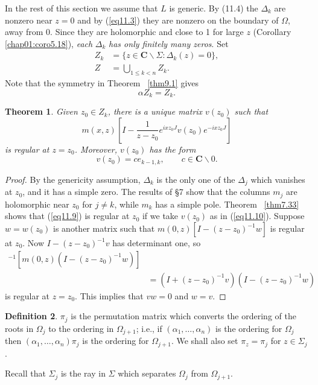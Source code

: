\documentclass{surv-l}
\theoremstyle{plain}
\newtheorem{theorem}{Theorem}[section]
\theoremstyle{definition}
\newtheorem{definition}[theorem]{Definition}
\numberwithin{equation}{chapter}
\begin{document}
In the rest of this section we assume that $L$ is generic. By (11.4) the $\Delta_{k}$ are nonzero near $z=0$ and by (\ref{eq11.3}) they are nonzero on the boundary of $\Omega$, away from $0$. Since they are holomorphic and close to 1 for large $z$ (Corollary \ref{chap01:coro5.18}), \emph{each} $\Delta_{k}$ \emph{has only finitely many zeros}. Set
\setcounter{equation}{5}
\begin{align}\label{eq11.6}
Z_{k}&=\{z\in \mathbf{C}\backslash \Sigma:\Delta_{k}(z)=0\},\\ \nonumber
Z&=\bigcup_{1\leq k<n}Z_{k}.
\end{align}
Note that the symmetry in Theorem ~\ref{thm9.1} gives
\begin{equation}\label{eq11.7}
\alpha Z_{k}=Z_{k}.
\end{equation}
\setcounter{theorem}{7}
\begin{theorem}\label{thm11.8}  Given $z_{0}\in Z_{k}$,  there is a  unique matrix $v(z_{0})$  such that
\setcounter{equation}{8}
\begin{equation}\label{eq11.9}
m(x, z)\left[I-\frac{1}{z-z_{0}}e^{ixz_{0}J}v(z_{0})e^{-ixz_{0}J}\right]
\end{equation}
is regular at $z=z_{0}$. Moreover, $v(z_{0})$ has the form
\begin{equation}\label{eq11.10}
v(z_{0})=ce_{k-1,k},\qquad c\in \mathbf{C}\backslash 0.
\end{equation}
\end{theorem}

\begin{proof} By the genericity assumption, $\Delta_{k}$ is the only one of the $\Delta_{j}$ which vanishes at $z_{0}$, and it has a simple zero. The results of \S 7 show that the columns $m_{j}$ are holomorphic near $z_{0}$ for $j \neq k$, while $m_{k}$ has a simple pole. Theorem ~\ref{thm7.33} shows that (\ref{eq11.9}) is regular at $z_{0}$ if we take $v(z_{0})$ as in (\ref{eq11.10}). Suppose
$w=w(z_{0})$ is another matrix such that $m(0, z)[I-(z-z_{0})^{-1}w]$ is regular at $z_{0}$. Now $I-(z-z_{0})^{-1}v$ has determinant one, so
\begin{align*}
[m(0, z)(I-&(z-z_{0})^{-1}v)]^{-1}[m(0, z)(I-(z-z_{0})^{-1}w)]\\
&=(I+(z-z_{0})^{-1}v)(I-(z -z_{0})^{-1}w)
\end{align*}
is regular at $z=z_{0}$. This implies that $vw=0$ and $w=v$.
\end{proof}
\setcounter{theorem}{10}
\begin{definition}\label{defi11.11} $\pi_{j}$ is the permutation matrix which converts the ordering of the roots in $\Omega_{j}$ to the ordering in $\Omega_{j+1}$; i.e., if $(\alpha_{1},\ldots, \alpha_{n})$ is the ordering for $\Omega_{j}$ then $(\alpha_{1},\ldots, \alpha_{n})\pi_{j}$ is the ordering for $\Omega_{j+1}$. We shall also set $\pi_{z}=\pi_{j}$ for $z\in\Sigma_{j}$.
\end{definition}
Recall that $\Sigma_{j}$ is the ray in $\Sigma$ which separates $\Omega_{j}$ from $\Omega_{j+1}$.
\end{document}
